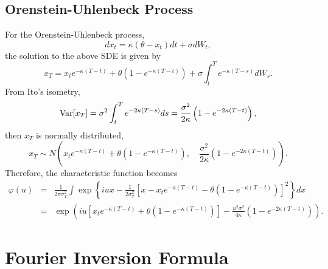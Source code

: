 \documentclass[12pt]{article}
\begin{document}
  \subsection{Orenstein-Uhlenbeck Process}

    For the Orenstein-Uhlenbeck process,
    \begin{equation}
      dx_t = \kappa\left(\theta-x_t\right)dt+\sigma dW_t,
    \end{equation}
    the solution to the above SDE is given by
    \begin{equation}
      x_T=x_te^{-\kappa(T-t)}+\theta\left(1-e^{-\kappa(T-t)}\right)+\sigma\int_t^Te^{-\kappa(T-s)}dW_s.
    \end{equation}
    From Ito's isometry,
    \begin{equation}
      {\rm Var}[x_T]=\sigma^2\int_t^Te^{-2\kappa(T-s)}ds=\frac{\sigma^2}{2\kappa}\left(1-e^{-2\kappa(T-t)}\right),
    \end{equation}
    then $x_T$ is normally distributed,
    \begin{equation}
      x_T\sim N\left(x_te^{-\kappa(T-t)}+\theta\left(1-e^{-\kappa(T-t)}\right),
                    \quad \frac{\sigma^2}{2\kappa}\left(1-e^{-2\kappa(T-t)}\right)\right).
    \end{equation}
    Therefore, the characteristic function becomes
    \begin{eqnarray}
      \varphi(u)&=&\frac{1}{2\pi\sigma_T^2}\int \exp\left\{iux-\frac{1}{2\sigma_T^2}
                      \left[x-x_te^{-\kappa(T-t)}-\theta\left(1-e^{-\kappa(T-t)}\right)\right]^2\right\}dx\nonumber\\
                &=&\exp\left(iu\left[x_te^{-\kappa(T-t)}+\theta\left(1-e^{-\kappa(T-t)}\right)\right]
                        -\frac{u^2\sigma^2}{4\kappa}\left(1-e^{-2\kappa(T-t)}\right)\right).
      \label{OU}
    \end{eqnarray}


\section{Fourier Inversion Formula}
\end{document}
